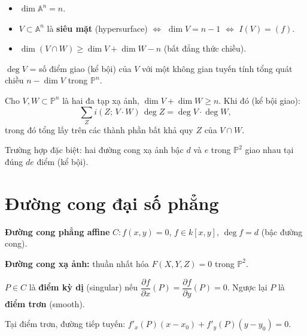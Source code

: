 \documentclass[12pt,a4paper]{article}
\begin{document}
\begin{tinhchat}
  \begin{itemize}
    \item $\dim \mathbb{A}^n = n$.
    \item $V \subset \mathbb{A}^n$ là \textbf{siêu mặt} (hypersurface) $\Leftrightarrow$ $\dim V = n - 1$ $\Leftrightarrow$ $I(V) = (f)$.
    \item $\dim(V \cap W) \ge \dim V + \dim W - n$ (bất đẳng thức chiều).
  \end{itemize}
\end{tinhchat}

\begin{dinhnghia}[title={Độ (degree) của đa tạp xạ ảnh}]
  $\deg V$ = số điểm giao (kể bội) của $V$ với một không gian tuyến tính tổng quát chiều $n - \dim V$ trong $\mathbb{P}^n$.
\end{dinhnghia}

\begin{dinhly}[title={Định lý Bézout}]
  Cho $V, W \subset \mathbb{P}^n$ là hai đa tạp xạ ảnh, $\dim V + \dim W \ge n$. Khi đó (kể bội giao):
  \[
    \sum_Z i(Z;\, V \cdot W)\,\deg Z = \deg V \cdot \deg W,
  \]
  trong đó tổng lấy trên các thành phần bất khả quy $Z$ của $V \cap W$.

  Trường hợp đặc biệt: hai đường cong xạ ảnh bậc $d$ và $e$ trong $\mathbb{P}^2$ giao nhau tại đúng $de$ điểm (kể bội).
\end{dinhly}

\section{Đường cong đại số phẳng}

\begin{dinhnghia}
  \textbf{Đường cong phẳng affine} $C: f(x, y) = 0$, $f \in k[x, y]$, $\deg f = d$ (bậc đường cong).

  \textbf{Đường cong xạ ảnh:} thuần nhất hóa $F(X, Y, Z) = 0$ trong $\mathbb{P}^2$.
\end{dinhnghia}

\begin{dinhnghia}[title={Điểm kỳ dị và điểm trơn}]
  $P \in C$ là \textbf{điểm kỳ dị} (singular) nếu $\dfrac{\partial f}{\partial x}(P) = \dfrac{\partial f}{\partial y}(P) = 0$. Ngược lại $P$ là \textbf{điểm trơn} (smooth).

  Tại điểm trơn, đường tiếp tuyến: $f'_x(P)(x - x_0) + f'_y(P)(y - y_0) = 0$.
\end{dinhnghia}
\end{document}
